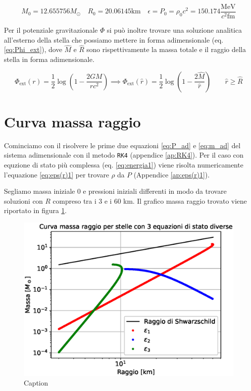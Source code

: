\documentclass[a4paper, titlepage]{article}
\begin{document}
\begin{equation}
    M_0 = 12.655756 M_\odot \quad R_0 = 20.06145 \unit{\kilo\meter} \quad \epsilon = P_0 = \rho_0 c^2 = 150.174 \frac{\unit{\mega\electronvolt}}{c^2 \unit{\femto\meter}}
    \label{eq:val_cost}
\end{equation}

Per il potenziale gravitazionale $\Phi$ si può inoltre trovare una soluzione analitica all'esterno della stella che possiamo mettere in forma adimensionale (eq. \ref{eq:Phi_ext}), dove $\hat{M}$ e $\hat R$ sono rispettivamente la massa totale e il raggio della stella in forma adimensionale.

\begin{equation}
    \Phi_\text{ext} (r) = \frac{1}{2} \log(1 - \frac{2 G M}{r c^2})
    \implies \Phi_\text{ext} (\hat r) = \frac{1}{2} \log(1 - \frac{2 \hat{M}}{\hat r}) \quad \quad \hat r \geq \hat{R}
    \label{eq:Phi_ext}
\end{equation}


\section{Curva massa raggio}
Cominciamo con il risolvere le prime due equazioni \ref{eq:P_ad} e \ref{eq:m_ad} del sistema adimensionale con il metodo \texttt{RK4} (appendice \ref{ap:RK4}).
Per il caso con equzione di stato più complessa (eq. \ref{eq:energia1}) viene risolta numericamente l'equazione \ref{eq:eps(r)1} per trovare $\rho$ da $P$ (Appendice \ref{ap:eps(r)1}).

Segliamo massa iniziale 0 e pressioni iniziali differenti in modo da trovare soluzioni con $R$ compreso tra i 3 e i 60 \unit{\kilo\meter}. Il grafico massa raggio trovato viene riportato in figura \ref{fig:MR}.

\begin{figure}[h]
        \centering
        \includegraphics[width = 0.6 \textwidth]{Figures/MR.eps}
        \caption{Caption}
        \label{fig:MR}
\end{figure}
\end{document}
